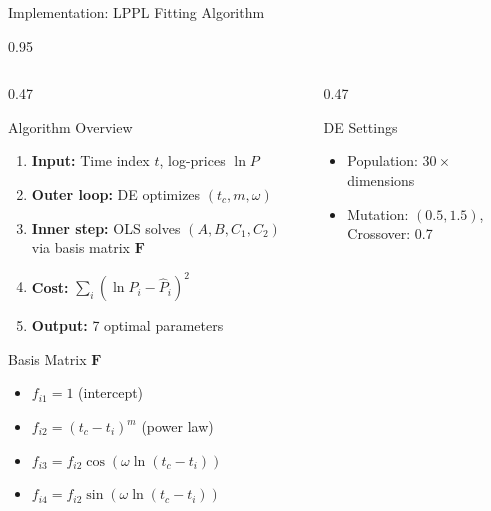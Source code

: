 \documentclass[9pt, aspectratio=169, t]{beamer}
\begin{document}
\begin{frame}{Implementation: LPPL Fitting Algorithm}
    \begin{cminipage}{0.95\textwidth}
    {\footnotesize
    \begin{columns}[T]
        \begin{column}{0.47\textwidth}
            \begin{block}{Algorithm Overview}
                \begin{enumerate}\setlength{\itemsep}{0pt}
                    \item \textbf{Input:} Time index $t$, log-prices $\ln P$
                    \item \textbf{Outer loop:} DE optimizes $(t_c, m, \omega)$
                    \item \textbf{Inner step:} OLS solves $(A, B, C_1, C_2)$ via basis matrix $\mathbf{F}$
                    \item \textbf{Cost:} $\sum_i (\ln P_i - \hat{P}_i)^2$
                    \item \textbf{Output:} 7 optimal parameters
                \end{enumerate}
            \end{block}
            \vspace{-1mm}
            \begin{exampleblock}{Basis Matrix $\mathbf{F}$}
                \begin{itemize}\setlength{\itemsep}{0pt}
                    \item $f_{i1} = 1$ (intercept)
                    \item $f_{i2} = (t_c - t_i)^m$ (power law)
                    \item $f_{i3} = f_{i2}\cos(\omega\ln(t_c - t_i))$
                    \item $f_{i4} = f_{i2}\sin(\omega\ln(t_c - t_i))$
                \end{itemize}
            \end{exampleblock}
        \end{column}
        \begin{column}{0.47\textwidth}
            \begin{alertblock}{DE Settings}
                \begin{itemize}\setlength{\itemsep}{0pt}
                    \item Population: $30 \times$ dimensions
                    \item Mutation: $(0.5, 1.5)$, Crossover: 0.7

\end{itemize}
\end{alertblock}
\end{column}
\end{columns}}
\end{cminipage}
\end{frame}
\end{document}
